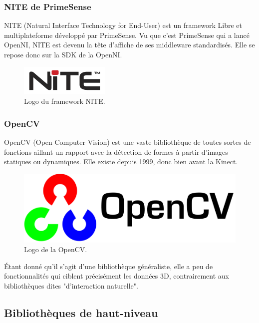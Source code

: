 \subsubsection{NITE de PrimeSense}
NITE (Natural Interface Technology for End-User) est un framework Libre et 
multiplateforme développé par PrimeSense. Vu que c'est PrimeSense qui a 
lancé OpenNI, NITE est devenu la tête d'affiche de ses
middleware standardisés. Elle se repose donc sur la SDK de la OpenNI. 
\begin{figure}[h!]
\centering
\includegraphics[width=0.3\linewidth]{../images/nite_logo}
\caption{Logo du framework NITE.}
\end{figure}

\subsubsection{OpenCV}
OpenCV (Open Computer Vision) est une vaste bibliothèque de toutes sortes de 
fonctions aillant un rapport avec la détection de formes à partir d'images
statiques ou dynamiques. Elle existe depuis 1999, donc bien avant la Kinect.
\begin{figure}[h!]
\centering
\includegraphics[width=0.4\linewidth]{../images/opencv_logo}
\caption{Logo de la OpenCV.}
\end{figure}
Étant donné qu'il s'agit d'une bibliothèque généraliste, elle a peu de 
fonctionnalités qui ciblent précisément les données 3D, contrairement aux 
bibliothèques dites "d'interaction naturelle".


\subsection{Bibliothèques de haut-niveau}

